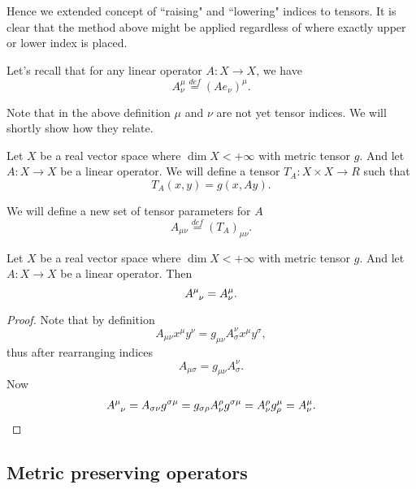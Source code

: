 \documentclass[main.tex]{subfiles}
\begin{document}
Hence we extended concept of ``raising" and ``lowering" indices to tensors. It is clear that the method above might be applied regardless of where exactly upper or lower index is placed.

Let's recall that for any linear operator $A: X \to X$, we have
\begin{equation}
A^\mu_\nu \stackrel{def}{=}(Ae_\nu)^\mu.
\end{equation} 

Note that in the above definition $\mu$ and $\nu$ are not yet tensor indices. We will shortly show how they relate.

\begin{definition}
Let $X$ be a real vector space where $\dim X < +\infty$ with metric tensor $g$. And let $A:X\to X$ be a linear operator. We will define a tensor $T_A: X\times X\to R$ such that
\begin{equation}
T_A(x, y) = g(x, Ay).
\end{equation}
\end{definition}  

We will define a new set of tensor parameters for $A$
\begin{equation}
A_{\mu\nu} \stackrel{def}{=} (T_A)_{\mu\nu}.
\end{equation}

\begin{theorem}
Let $X$ be a real vector space where $\dim X < +\infty$ with metric tensor $g$. And let $A:X\to X$ be a linear operator. Then
\begin{equation}
\tensor{A}{^\mu_\nu} = A^\mu_\nu.
\end{equation}
\end{theorem}
\begin{proof}
Note that by definition
\begin{equation}
A_{\mu\nu} x^\mu y^\nu = g_{\mu\nu} A^\nu_\sigma x^\mu y^\sigma,
\end{equation}
thus after rearranging indices
\begin{equation}
A_{\mu\sigma} = g_{\mu \nu} A^\nu_\sigma.
\end{equation}
Now
\begin{align}
\tensor{A}{^\mu_\nu} = A_{\sigma\nu}g^{\sigma\mu} = g_{\sigma \rho} A^\rho_\nu g^{\sigma\mu} = A^\rho_\nu g^\mu_\rho = A^\mu_\nu.
\end{align}
\end{proof}

\subsection{Metric preserving operators}
\label{metric-preserving-operators}
\end{document}
